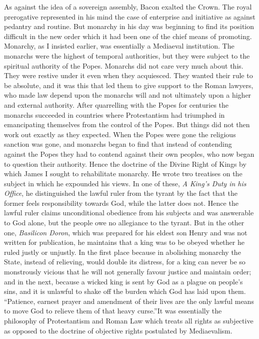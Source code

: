 \documentclass{book}
\begin{document}
As against the idea of a sovereign assembly, Bacon exalted the Crown. The royal prerogative represented in his mind the case of enterprise and initiative as against pedantry and routine. But monarchy in his day was beginning to find its position difficult in the new order which it had been one of the chief means of promoting. Monarchy, as I insisted earlier, was essentially a Mediaeval institution. The monarchs were the highest of temporal authorities, but they were subject to the spiritual authority of the Popes. Monarchs did not care very much about this. They were restive under it even when they acquiesced. They wanted their rule to be absolute, and it was this that led them to give support to the Roman lawyers, who made law depend upon the monarchs will and not ultimately upon a higher and external authority. After quarrelling with the Popes for centuries the monarchs succeeded in countries where Protestantism had triumphed in emancipating themselves from the control of the Popes. But things did not then work out exactly as they expected. When the Popes were gone the religious sanction was gone, and monarchs began to find that instead of contending against the Popes they had to contend against their own peoples, who now began to question their authority. Hence the doctrine of the Divine Right of Kings by which James I sought to rehabilitate monarchy. He wrote two treatises on the subject in which he expounded his views. In one of these, \emph{A King’s Duty in his Office}, he distinguished the lawful ruler from the tyrant by the fact that the former feels responsibility towards God, while the latter does not. Hence the lawful ruler claims unconditional obedience from his subjects and was answerable to God alone, but the people owe no allegiance to the tyrant. But in the other one, \emph{Basilicon Doron}, which was prepared for his eldest son Henry and was not written for publication, he maintains that a king was to be obeyed whether he ruled justly or unjustly. In the first place because in abolishing monarchy the State, instead of relieving, would double its distress, for a king can never be so monstrously vicious that he will not generally favour justice and maintain order; and in the next, because a wicked king is sent by God as a plague on people’s sins, and it is unlawful to shake off the burden which God has laid upon them. “Patience, earnest prayer and amendment of their lives are the only lawful means to move God to relieve them of that heavy curse.”\footnotemark[6] It was essentially the philosophy of Protestantism and Roman Law which treats all rights as subjective as opposed to the doctrine of objective rights postulated by Mediaevalism.\footnotemark[7]
\end{document}
